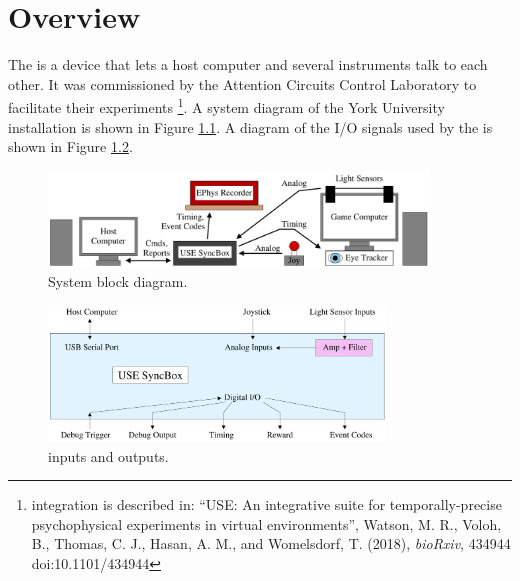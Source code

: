 %

\chapter{Overview}
\label{sect-over}

The {\projectname} is a device that lets a host computer and several 
instruments talk to each other. It was commissioned by the Attention 
Circuits Control Laboratory to facilitate their experiments%
\footnote{{\projectname} integration is described in:
``USE: An integrative suite for temporally-precise psychophysical
experiments in virtual environments'', Watson, M. R., Voloh, B.,
Thomas, C. J., Hasan, A. M., and Womelsdorf, T. (2018), \textit{bioRxiv},
434944  doi:10.1101/434944}.
%
A system diagram of the York University installation is shown in 
Figure \ref{fig-over-system}. A diagram of the I/O signals used by the 
{\projectname} is shown in Figure \ref{fig-over-signals}.

\begin{figure}[h]
\begin{center}
\includegraphics[width=0.9\textwidth]{figs/system.pdf}
\end{center}
\caption{System block diagram.}\label{fig-over-system}
\end{figure}

\begin{figure}[H]
\begin{center}
\includegraphics[width=0.8\textwidth]{figs/signals.pdf}
\end{center}
\caption{{\projectname} inputs and outputs.}\label{fig-over-signals}
\end{figure}

